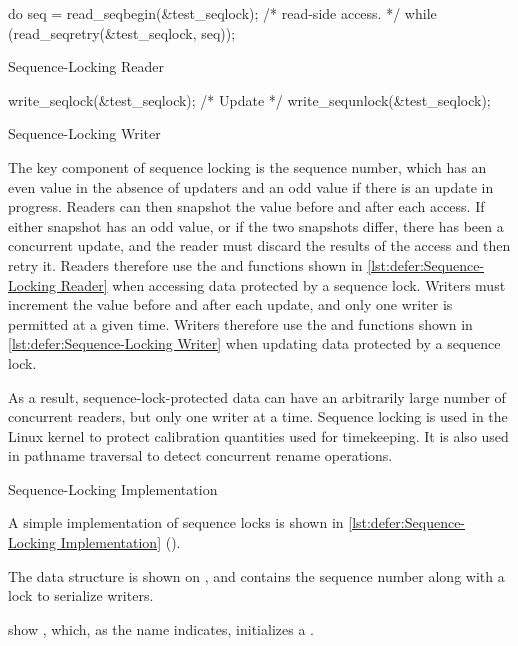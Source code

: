 \begin{listing}
\begin{VerbatimL}
do {
	seq = read_seqbegin(&test_seqlock);
	/* read-side access. */
} while (read_seqretry(&test_seqlock, seq));
\end{VerbatimL}
\caption{Sequence-Locking Reader}
\label{lst:defer:Sequence-Locking Reader}
\end{listing}

\begin{listing}
\begin{VerbatimL}
write_seqlock(&test_seqlock);
/* Update */
write_sequnlock(&test_seqlock);
\end{VerbatimL}
\caption{Sequence-Locking Writer}
\label{lst:defer:Sequence-Locking Writer}
\end{listing}

The key component of sequence locking is the sequence number, which has
an even value in the absence of updaters and an odd value if there
is an update in progress.
Readers can then snapshot the value before and after each access.
If either snapshot has an odd value, or if the two snapshots differ,
there has been a concurrent update, and the reader must discard
the results of the access and then retry it.
Readers therefore use the  and 
functions shown in \cref{lst:defer:Sequence-Locking Reader}
when accessing data protected by a sequence lock.
Writers must increment the value before and after each update,
and only one writer is permitted at a given time.
Writers therefore use the  and 
functions shown in \cref{lst:defer:Sequence-Locking Writer}
when updating data protected by a sequence lock.

As a result, sequence-lock-protected data can have an arbitrarily
large number of concurrent readers, but only one writer at a time.
Sequence locking is used in the Linux kernel to protect calibration
quantities used for timekeeping.
It is also used in pathname traversal to detect concurrent rename operations.

\begin{listing}

\caption{Sequence-Locking Implementation}
\label{lst:defer:Sequence-Locking Implementation}
\end{listing}

A simple implementation of sequence locks is shown in
\cref{lst:defer:Sequence-Locking Implementation}
().
\begin{fcvref}
The  data structure is shown on
, and contains
the sequence number along with a lock to serialize writers.
\end{fcvref}
\begin{fcvref}
 show , which, as the name indicates,
initializes a .
\end{fcvref}

